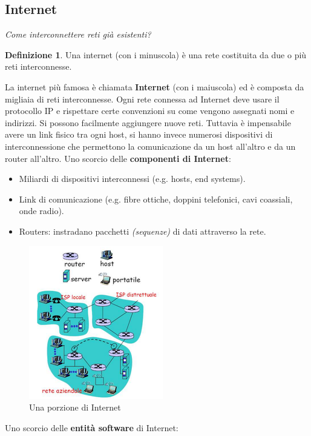 \documentclass[11pt,a4paper]{article}
\theoremstyle{definition}
\newtheorem{definition}{Definizione}[section]
\begin{document}
\subsection{Internet}
\textit{Come interconnettere reti già esistenti?}\newline
\theoremstyle{definition}
\begin{definition}
	Una internet (con i minuscola) è una rete costituita da
	due o più reti interconnesse.
\end{definition}
La internet più famosa è chiamata \textbf{Internet} (con i maiuscola) ed è composta da migliaia di reti interconnesse. Ogni rete connessa ad Internet deve usare il protocollo IP e rispettare certe convenzioni su come vengono assegnati nomi e indirizzi.
Si possono facilmente aggiungere nuove reti. \newline Tuttavia è impensabile avere un link fisico tra ogni host, si hanno invece numerosi
dispositivi di interconnessione che permettono la comunicazione da un host all'altro e da un router all'altro.\newline
Uno scorcio delle \textbf{componenti di Internet}:
\begin{itemize}
	\item Miliardi di dispositivi interconnessi (e.g. hosts, end systems).
	\item Link di comunicazione (e.g. fibre ottiche, doppini telefonici,
	      cavi coassiali, onde radio).
	\item Routers: instradano pacchetti \textit{(sequenze)} di dati attraverso la rete.
\end{itemize}

\begin{figure}[!h]
	\includegraphics[scale=0.5]{Immagini/Internet.png}
	\centering
	\caption{Una porzione di Internet}
\end{figure}

Uno scorcio delle \textbf{entità software} di Internet:
\end{document}

